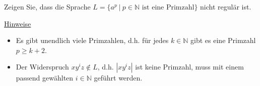 \documentclass{uebungsblatt}
\begin{document}


\begin{aufgabe}
Zeigen Sie, dass die Sprache 
$L = \{a^p \ | \ p \in \mathbb{N} \text{ ist eine Primzahl}\}$ nicht regulär ist.\\

\medskip
\underline{Hinweise}

\begin{itemize}
\item
Es gibt unendlich viele Primzahlen, d.h. für jedes 
$k \in \mathbb{N}$ gibt es eine Primzahl $p \geq k + 2$.
\item
Der Widerspruch $xy^iz \not\in L$, d.h. $|xy^iz|$ ist keine Primzahl,
muss mit einem passend gewählten $i \in \mathbb{N}$ geführt werden.
\end{itemize}

\end{aufgabe}
\begin{loesung} 

\end{loesung}
\newpage
\end{document}
